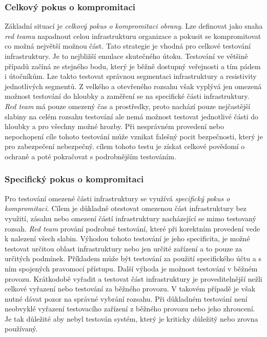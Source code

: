 \subsubsection{Celkový pokus o kompromitaci}
Základní situací je \textit{celkový pokus o kompromitaci obrany}.
Lze definovat jako snaha \textit{red teamu} napadnout celou infrastrukturu organizace a pokusit se kompromitovat co možná největší možnou část.
Tato strategie je vhodná pro celkové testování infrastruktury.
Je to nejbližší emulace skutečného útoku.
Testování ve většině případů začíná ze stejného bodu, který je běžně dostupný veřejnosti a tím pádem i útočníkům.
Lze takto testovat správnou segmentaci infrastruktury a resistivity jednotlivých segmentů.
Z velkého a otevřeného rozsahu však vyplývá jen omezená možnost testování do hloubky a zaměření se na specifické části infrastruktury.
\textit{Red team} má pouze omezený čas a prostředky, proto nachází pouze nejčastější slabiny na celém rozsahu testování ale nemá možnost testovat jednotlivé části do hloubky a pro všechny možné hrozby.
Při nesprávném provedení nebo nepochopení cíle tohoto testování může vznikat falešný pocit bezpečnosti, který je pro zabezpečení nebezpečný.
cílem tohoto testu je získat celkové povědomí o ochraně a poté pokračovat s podrobnějším testováním.

\subsubsection{Specifický pokus o kompromitaci}
Pro testování omezené části infrastruktury se využívá \textit{specifický pokus o kompromitaci}.
Cílem je důkladně otestovat omezenou část infrastruktury bez využití, zásahu nebo omezení částí infrastruktury nacházející se mimo testovaný rozsah.
\textit{Red team} prování podrobné testování, které při korektním provedení vede k nalezení všech slabin.
Výhodou tohoto testování je jeho specificita, je možné testovat určitou oblast infrastruktury nebo jen určité zařízení a to pouze za určitých podmínek.
Příkladem může být testování za použití specifického účtu a s ním spojených pravomocí přístupu.
Další výhoda je možnost testování v běžném provozu.
Krátkodobě vyřadit a testovat část infrastruktury je proveditelnější nežli celkové vyřazení nebo testování za běžného provozu.
V takovém případě je však nutné dávat pozor na správné vybrání rozsahu.
Při důkladném testování není neobvyklé vyřazení testovacího zařízení z běžného provozu nebo jeho zhroucení.
Je tak důležité aby nebyl testován systém, který je kriticky důležitý nebo zrovna používaný.

